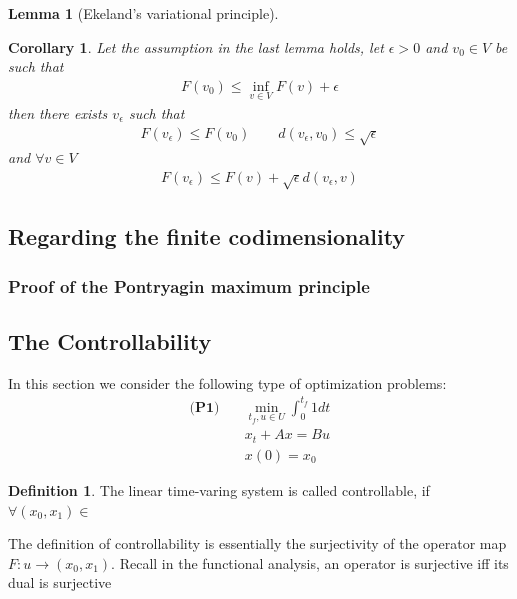 \documentclass[a4paper,11pt,fleqn]{book}
\newtheorem{corollary}{Corollary}[theorem]
\newtheorem{lemma}[theorem]{Lemma}
\theoremstyle{definition}
\newtheorem{definition}{Definition}[section]
\theoremstyle{remark}
\begin{document}
\begin{lemma}[Ekeland's variational principle]	
\end{lemma}

\begin{corollary}
	Let the assumption in the last lemma holds, let $\epsilon >0$ and $v_0 \in V$ be such that 
	\begin{align*}
		F(v_0) \le \inf_{v \in V} F(v) + \epsilon
	\end{align*}
	then there exists $v_\epsilon$ such that 
	\begin{align*}
		F(v_\epsilon) \le F(v_0) \qquad d(v_\epsilon, v_0) \le \sqrt{\epsilon}
	\end{align*}
	and $\forall v \in V$
	\begin{align*}
		F(v_\epsilon) \le F(v) + \sqrt{\epsilon} d(v_\epsilon, v)
	\end{align*}
\end{corollary}


\subsection{Regarding the finite codimensionality}

\subsubsection*{Proof of the Pontryagin maximum principle}




\subsection{The Controllability}
In this section we consider the following type of optimization problems:
\begin{align*}
\textbf{(P1)} \quad
	&\min_{t_f, u \in U} \int_0^{t_f} 1 dt \\ 
	& x_t + Ax = Bu\\
	& x(0) = x_0
\end{align*}

\begin{definition}
	The linear time-varing system is called controllable, if $\forall (x_0, x_1) \in  $
\end{definition}

The definition of controllability is essentially the surjectivity of the operator map $ F:u \rightarrow (x_0, x_1)$. Recall in the functional analysis, an operator is surjective iff its dual is surjective
\end{document}
